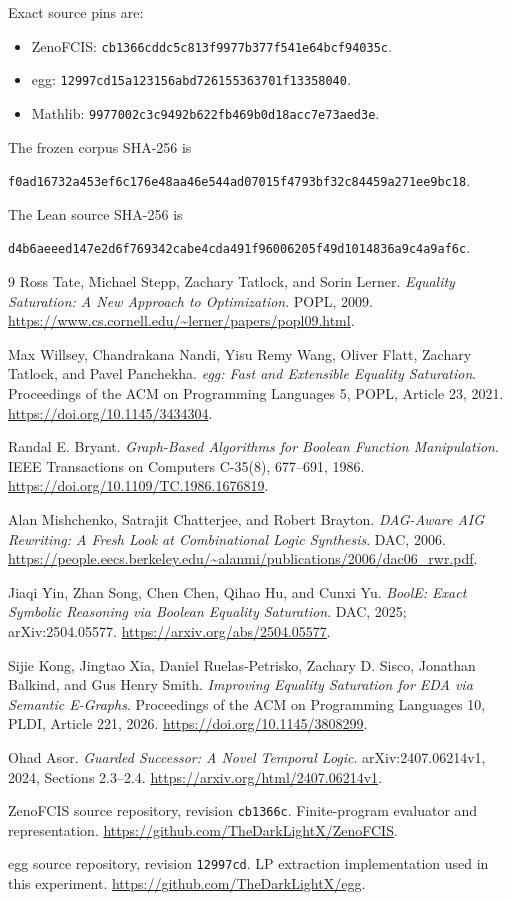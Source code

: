 \documentclass[11pt]{article}
\begin{document}
Exact source pins are:
\begin{itemize}
\item ZenoFCIS:
  \nolinkurl{cb1366cddc5c813f9977b377f541e64bcf94035c}.
\item egg:
  \nolinkurl{12997cd15a123156abd726155363701f13358040}.
\item Mathlib:
  \nolinkurl{9977002c3c9492b622fb469b0d18acc7e73aed3e}.
\end{itemize}
The frozen corpus SHA-256 is
\begin{center}\small
\nolinkurl{f0ad16732a453ef6c176e48aa46e544ad07015f4793bf32c84459a271ee9bc18}.
\end{center}
The Lean source SHA-256 is
\begin{center}\small
\nolinkurl{d4b6aeeed147e2d6f769342cabe4cda491f96006205f49d1014836a9c4a9af6c}.
\end{center}

\begin{thebibliography}{9}
Ross Tate, Michael Stepp, Zachary Tatlock, and Sorin Lerner.
\emph{Equality Saturation: A New Approach to Optimization}.
POPL, 2009.
\url{https://www.cs.cornell.edu/~lerner/papers/popl09.html}.

Max Willsey, Chandrakana Nandi, Yisu Remy Wang, Oliver Flatt,
Zachary Tatlock, and Pavel Panchekha.
\emph{egg: Fast and Extensible Equality Saturation}.
Proceedings of the ACM on Programming Languages 5, POPL, Article 23, 2021.
\url{https://doi.org/10.1145/3434304}.

Randal E. Bryant.
\emph{Graph-Based Algorithms for Boolean Function Manipulation}.
IEEE Transactions on Computers C-35(8), 677--691, 1986.
\url{https://doi.org/10.1109/TC.1986.1676819}.

Alan Mishchenko, Satrajit Chatterjee, and Robert Brayton.
\emph{DAG-Aware AIG Rewriting: A Fresh Look at Combinational Logic Synthesis}.
DAC, 2006.
\url{https://people.eecs.berkeley.edu/~alanmi/publications/2006/dac06_rwr.pdf}.

Jiaqi Yin, Zhan Song, Chen Chen, Qihao Hu, and Cunxi Yu.
\emph{BoolE: Exact Symbolic Reasoning via Boolean Equality Saturation}.
DAC, 2025; arXiv:2504.05577.
\url{https://arxiv.org/abs/2504.05577}.

Sijie Kong, Jingtao Xia, Daniel Ruelas-Petrisko, Zachary D. Sisco,
Jonathan Balkind, and Gus Henry Smith.
\emph{Improving Equality Saturation for EDA via Semantic E-Graphs}.
Proceedings of the ACM on Programming Languages 10, PLDI, Article 221, 2026.
\url{https://doi.org/10.1145/3808299}.

Ohad Asor. \emph{Guarded Successor: A Novel Temporal Logic}.
arXiv:2407.06214v1, 2024, Sections 2.3--2.4.
\url{https://arxiv.org/html/2407.06214v1}.

ZenoFCIS source repository, revision \texttt{cb1366c}.
Finite-program evaluator and representation.
\url{https://github.com/TheDarkLightX/ZenoFCIS}.

egg source repository, revision \texttt{12997cd}.
LP extraction implementation used in this experiment.
\url{https://github.com/TheDarkLightX/egg}.
\end{thebibliography}
\end{document}
